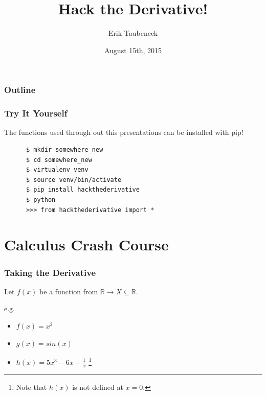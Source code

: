 \documentclass{beamer}
\title{
{\bf{\textsf{Hack the Derivative!}}}}
\author[Erik Taubeneck]{Erik Taubeneck}
\institute{
  \texttt{[image: gamechanger.png]}

  Software Engineer

  We're hiring! \url{https://gc.com/about/careers}
}
\date{August 15th, 2015}
\def\R{\mathbb{R}}                     %
\begin{document}


\begin{frame}
  \titlepage
\end{frame}


\begin{frame}
\frametitle{Outline}
\tableofcontents
\end{frame}

\begin{frame}[fragile]

  \frametitle{Try It Yourself}

  The functions used through out this presentations can be installed with pip!

  \begin{lstlisting}
      $ mkdir somewhere_new
      $ cd somewhere_new
      $ virtualenv venv
      $ source venv/bin/activate
      $ pip install hackthederivative
      $ python
      >>> from hackthederivative import *
  \end{lstlisting}

\end{frame}


\section{Calculus Crash Course}

\begin{frame}

  \frametitle{Taking the Derivative}

  Let $f(x)$ be a function from $\R \to X \subseteq \R$.

  e.g.
  \begin{itemize}
    \item $f(x) = x^2$
    \item $g(x) = sin(x)$
    \item $h(x) = 5x^3 - 6x + \frac{1}{x}$ \footnote{Note that $h(x)$ is not defined at $x=0$.}
  \end{itemize}



\end{frame}
\end{document}
